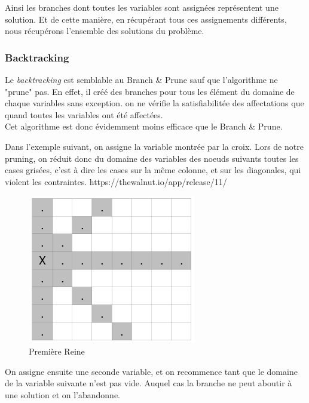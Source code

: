 \documentclass{article}
\begin{document}
Ainsi les branches dont toutes les variables sont assignées représentent une solution. Et de cette manière, en récupérant tous ces assignements différents, nous récupérons l'ensemble des solutions du problème. 

\clearpage

\subsubsection{Backtracking}
Le \emph{backtracking} est semblable au Branch \& Prune sauf que l'algorithme ne "prune" pas. En effet, il créé des branches pour tous les 
élément du domaine de chaque variables sans exception. on ne vérifie la satisfiabilitée des affectations que quand toutes les variables
ont été affectées.\\
Cet algorithme est donc évidemment moins efficace que le Branch \& Prune.


Dans l'exemple suivant, on assigne la variable montrée par la croix. Lors de notre pruning, on réduit donc du domaine des variables des noeuds suivants toutes les cases grisées, c'est à dire les cases sur la même colonne, et sur les diagonales, qui violent les contraintes. 
https://thewalnut.io/app/release/11/ 
\begin{figure}[h]
\caption{\label{reine1} Première Reine}
\begin{center}
\includegraphics[scale=0.5]{./picture/pruning1.png}
\end{center}
\end{figure}

On assigne ensuite une seconde variable, et on recommence tant que le domaine de la variable suivante n'est pas vide. Auquel cas la branche ne peut aboutir à une solution et on l'abandonne.
\end{document}
